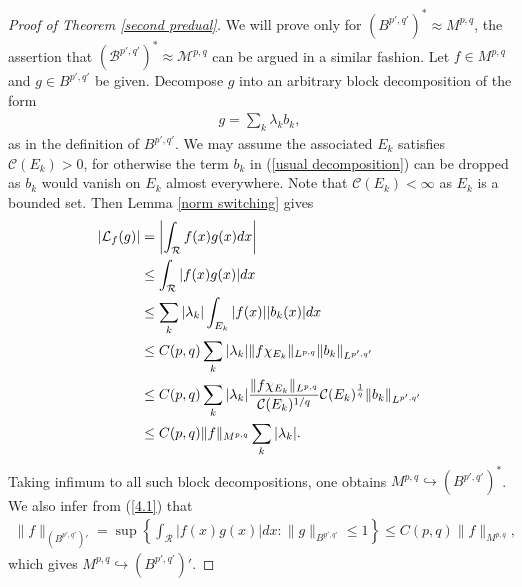 \documentclass[10pt,reqno]{amsart}
\numberwithin{equation}{section}
\begin{document}
\begin{proof}[Proof of Theorem \ref{second predual}]
We will prove only for $(B^{p',q'})^{\ast}\approx M^{p,q}$, the assertion that $(\mathcal{B}^{p',q'})^{\ast}\approx\mathcal{M}^{p,q}$ can be argued in a similar fashion. Let $f\in M^{p,q}$ and $g\in B^{p',q'}$ be given. Decompose $g$ into an arbitrary block decomposition of the form
\begin{align}\label{usual decomposition}
g=\sum_{k}\lambda_{k}b_{k},
\end{align}
as in the definition of $B^{p',q'}$. We may assume the associated $E_{k}$ satisfies $\mathcal{C}(E_{k})>0$, for otherwise the term $b_{k}$ in (\ref{usual decomposition}) can be dropped as $b_{k}$ would vanish on $E_{k}$ almost everywhere. Note that $\mathcal{C}(E_{k})<\infty$ as $E_{k}$ is a bounded set. Then Lemma \ref{norm switching} gives
\begin{align}
|\mathcal{L}_{f}(g)|&=\left|\int_{\mathcal{R}}f(x)g(x)dx\right|\notag\\
&\leq\int_{\mathcal{R}}|f(x)g(x)|dx\notag\\
&\leq\sum_{k}|\lambda_{k}|\int_{E_{k}}|f(x)||b_{k}(x)|dx\notag\\
&\leq C(p,q)\sum_{k}|\lambda_{k}|\|f\chi_{E_{k}}\|_{L^{p,q}}\|b_{k}\|_{L^{p',q'}}\notag\\
&\leq C(p,q)\sum_{k}|\lambda_{k}|\frac{\|f\chi_{E_{k}}\|_{L^{p,q}}}{\mathcal{C}(E_{k})^{1/q}}\mathcal{C}(E_{k})^{\frac{1}{q}}\|b_{k}\|_{L^{p',q'}}\notag\\
&\leq C(p,q)\|f\|_{M^{p,q}}\sum_{k}|\lambda_{k}|.\label{4.1}
\end{align}
Taking infimum to all such block decompositions, one obtains $M^{p,q}\hookrightarrow(B^{p',q'})^{\ast}$. We also infer from (\ref{4.1}) that 
\begin{align*}
\|f\|_{(B^{p',q'})'}=\sup\left\{\int_{\mathcal{R}}|f(x)g(x)|dx:\|g\|_{B^{p',q'}}\leq 1\right\}\leq C(p,q)\|f\|_{M^{p,q}},
\end{align*}
which gives $M^{p,q}\hookrightarrow(B^{p',q'})'$.


\end{proof}
\end{document}
